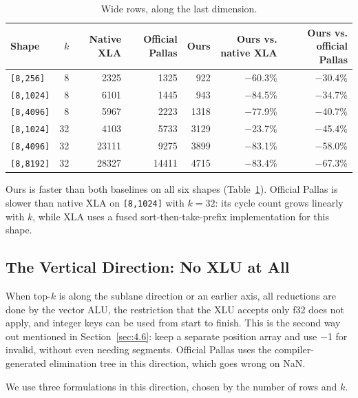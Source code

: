 \documentclass[sigconf,nonacm,balance=false]{acmart}
\newcommand{\code}[1]{\texttt{#1}}
\begin{document}
\begin{table}
\centering
\caption{Wide rows, along the last dimension.}
\label{tab:6}
\begin{tabular}{lrrrrrr}
\toprule
Shape & $k$ & Native XLA & Official Pallas & Ours & Ours vs. native XLA & Ours vs. official Pallas \\
\midrule
\code{[8,\allowbreak{}256]} & 8 & 2325\dag{}\ddag{} & 1325 & 922 & $-$60.3\% & $-$30.4\% \\
\code{[8,\allowbreak{}1024]} & 8 & 6101 & 1445 & 943 & $-$84.5\% & $-$34.7\% \\
\code{[8,\allowbreak{}4096]} & 8 & 5967 & 2223 & 1318 & $-$77.9\% & $-$40.7\% \\
\code{[8,\allowbreak{}1024]} & 32 & 4103\ddag{} & 5733 & 3129 & $-$23.7\% & $-$45.4\% \\
\code{[8,\allowbreak{}4096]} & 32 & 23111 & 9275 & 3899 & $-$83.1\% & $-$58.0\% \\
\code{[8,\allowbreak{}8192]} & 32 & 28327 & 14411 & 4715 & $-$83.4\% & $-$67.3\% \\
\bottomrule
\end{tabular}
\end{table}

Ours is faster than both baselines on all six shapes (Table~\ref{tab:6}). Official Pallas is slower than native XLA on \code{[8,\allowbreak{}1024]} with $k = 32$: its cycle count grows linearly with $k$, while XLA uses a fused sort-then-take-prefix implementation for this shape.

\subsection{The Vertical Direction: No XLU at All}
\label{sec:5.2}

When top-$k$ is along the sublane direction or an earlier axis, all reductions are done by the vector ALU, the restriction that the XLU accepts only f32 does not apply, and integer keys can be used from start to finish. This is the second way out mentioned in Section~\ref{sec:4.6}: keep a separate position array and use $-$1 for invalid, without even needing segments. Official Pallas uses the compiler-generated elimination tree in this direction, which goes wrong on NaN.

We use three formulations in this direction, chosen by the number of rows and $k$.
\end{document}
